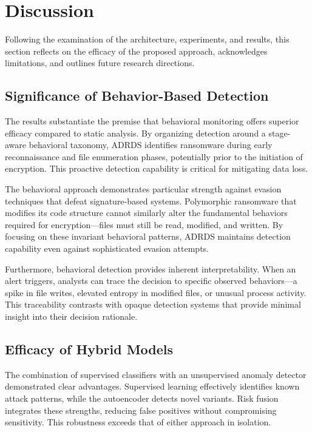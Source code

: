 \section{Discussion}

Following the examination of the architecture, experiments, and results, this section reflects on the efficacy of the proposed approach, acknowledges limitations, and outlines future research directions.

\subsection{Significance of Behavior-Based Detection}

The results substantiate the premise that behavioral monitoring offers superior efficacy compared to static analysis. By organizing detection around a stage-aware behavioral taxonomy, ADRDS identifies ransomware during early reconnaissance and file enumeration phases, potentially prior to the initiation of encryption. This proactive detection capability is critical for mitigating data loss.

The behavioral approach demonstrates particular strength against evasion techniques that defeat signature-based systems. Polymorphic ransomware that modifies its code structure cannot similarly alter the fundamental behaviors required for encryption—files must still be read, modified, and written. By focusing on these invariant behavioral patterns, ADRDS maintains detection capability even against sophisticated evasion attempts.

Furthermore, behavioral detection provides inherent interpretability. When an alert triggers, analysts can trace the decision to specific observed behaviors—a spike in file writes, elevated entropy in modified files, or unusual process activity. This traceability contrasts with opaque detection systems that provide minimal insight into their decision rationale.

\subsection{Efficacy of Hybrid Models}

The combination of supervised classifiers with an unsupervised anomaly detector demonstrated clear advantages. Supervised learning effectively identifies known attack patterns, while the autoencoder detects novel variants. Risk fusion integrates these strengths, reducing false positives without compromising sensitivity. This robustness exceeds that of either approach in isolation.

